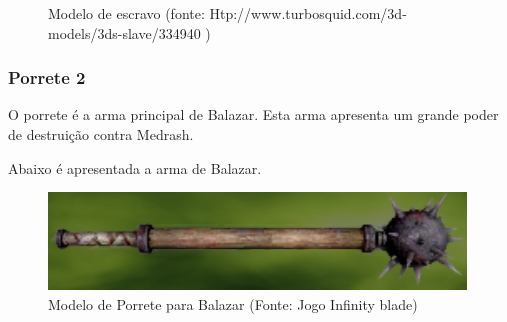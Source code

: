 \begin{itemize}
\begin{figure}[H]
 \caption{Modelo de escravo (fonte: Htp://www.turbosquid.com/3d-models/3ds-slave/334940 )}
\label{img:escrava}
\end{figure}
\end{itemize}
\subsubsection{Porrete 2}
O porrete é a arma principal de Balazar. Esta arma apresenta um grande poder de destruição contra Medrash.

Abaixo é apresentada a arma de Balazar.

\begin{figure}[H]
 \centering
 \includegraphics[scale=1]{Imagens/porrete02.png}
 \caption{Modelo de Porrete para Balazar (Fonte: Jogo Infinity blade)}
\label{img:porrete02}
\end{figure}